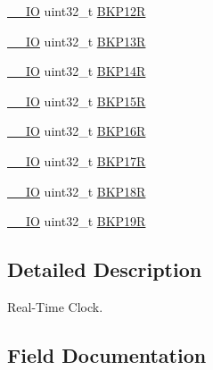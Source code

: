 \begin{DoxyCompactItemize}
\item 
\hyperlink{core__sc300_8h_aec43007d9998a0a0e01faede4133d6be}{\+\_\+\+\_\+\+IO} uint32\+\_\+t \hyperlink{struct_r_t_c___type_def_a6606b5d249f923aa15ab74b382cbaf7e}{B\+K\+P12R}
\item 
\hyperlink{core__sc300_8h_aec43007d9998a0a0e01faede4133d6be}{\+\_\+\+\_\+\+IO} uint32\+\_\+t \hyperlink{struct_r_t_c___type_def_a138903d4681455a660dccbaf3409263d}{B\+K\+P13R}
\item 
\hyperlink{core__sc300_8h_aec43007d9998a0a0e01faede4133d6be}{\+\_\+\+\_\+\+IO} uint32\+\_\+t \hyperlink{struct_r_t_c___type_def_adaae50f5c3213014fb9818eaee389676}{B\+K\+P14R}
\item 
\hyperlink{core__sc300_8h_aec43007d9998a0a0e01faede4133d6be}{\+\_\+\+\_\+\+IO} uint32\+\_\+t \hyperlink{struct_r_t_c___type_def_a797f43f9cc1858baebd1799be288dff6}{B\+K\+P15R}
\item 
\hyperlink{core__sc300_8h_aec43007d9998a0a0e01faede4133d6be}{\+\_\+\+\_\+\+IO} uint32\+\_\+t \hyperlink{struct_r_t_c___type_def_a181ad73082bde7d74010aac16bd373fc}{B\+K\+P16R}
\item 
\hyperlink{core__sc300_8h_aec43007d9998a0a0e01faede4133d6be}{\+\_\+\+\_\+\+IO} uint32\+\_\+t \hyperlink{struct_r_t_c___type_def_a90a305a8e00b357f28daef5041e5a8b1}{B\+K\+P17R}
\item 
\hyperlink{core__sc300_8h_aec43007d9998a0a0e01faede4133d6be}{\+\_\+\+\_\+\+IO} uint32\+\_\+t \hyperlink{struct_r_t_c___type_def_a171288f82cab2623832de779fb435d74}{B\+K\+P18R}
\item 
\hyperlink{core__sc300_8h_aec43007d9998a0a0e01faede4133d6be}{\+\_\+\+\_\+\+IO} uint32\+\_\+t \hyperlink{struct_r_t_c___type_def_a993f54e8feff9254f795dfd3e000fc55}{B\+K\+P19R}
\end{DoxyCompactItemize}


\subsection{Detailed Description}
Real-\/\+Time Clock. 

\subsection{Field Documentation}
\mbox{\label{struct_r_t_c___type_def_ad7e54d5c5a4b9fd1e26aca85b1e36c7f}} 
